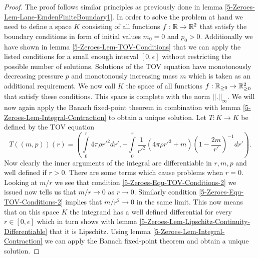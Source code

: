 \begin{proof}
	The proof follows similar principles as previously done in lemma \ref{5-Zeroes-Lem-Lane-EmdenFiniteBoundary1}.
	In order to solve the problem at hand we need to define a space $K$ consisting of all functions $f:\mathbb{R}\rightarrow\mathbb{R}^2$ that satisfy the boundary conditions in form of initial values $m_0=0$ and $p_0>0$.
	Additionally we have shown in lemma \ref{5-Zeroes-Lem-TOV-Conditions} that we can apply the listed conditions for a small enough interval $[0,\epsilon]$ without restricting the possible number of solutions.
	Solutions of the \ac{TOV} equation have monotonously decreasing pressure $p$ and monotonously increasing mass $m$ which is taken as an additional requirement.
	We now call $K$ the space of all functions $f:\mathbb{R}_{\geq0}\rightarrow\mathbb{R}_{\geq0}^2$ that satisfy these conditions.
	This space is complete with the norm $||.||_\infty$.
	We will now again apply the Banach fixed-point theorem in combination with lemma \ref{5-Zeroes-Lem-Integral-Contraction} to obtain a unique solution.
	Let $T:K\rightarrow K$ be defined by the \ac{TOV} equation
	\begin{equation}
		T((m,p))(r)=\left(\int\limits_0^r 4\pi\rho r'^2dr',-\int\limits_0^r\frac{1}{r'^2}(4\pi\rho r'^3 + m)\left(1-\frac{2m}{r'}\right)^{-1}dr'\right).
	\end{equation}
	Now clearly the inner arguments of the integral are differentiable in $r,m,p$ and well defined if $r>0$.
	There are some terms which cause problems when $r=0$.
	Looking at $m/r$ we see that condition \eqref{5-Zeroes-Equ-TOV-Conditions-2} we issued now tells us that $m/r\rightarrow0$ as $r\rightarrow0$.
	Similarly condition \eqref{5-Zeroes-Equ-TOV-Conditions-2} implies that $m/r^2\rightarrow0$ in the same limit.
	This now means that on this space $K$ the integrand has a well defined differential for every $r\in[0,\epsilon]$ which in turn shows with lemma \ref{5-Zeroes-Lem-Lipschitz-Continuity-Differentiable} that it is Lipschitz.
	Using lemma \ref{5-Zeroes-Lem-Integral-Contraction} we can apply the Banach fixed-point theorem and obtain a unique solution.
\end{proof}
%
%
%
